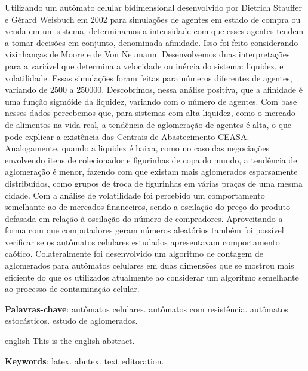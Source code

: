 \documentclass[
	12pt,				%
	openright,			%
	twoside,			%
	a4paper,			%
	english,			%
	french,				%
	spanish,			%
	brazil				%
	]{abntex2}
\begin{document}
\setlength{\absparsep}{18pt} %
\begin{resumo}
  Utilizando um autômato celular bidimensional desenvolvido por Dietrich Stauffer e Gérard Weisbuch em 2002 para simulações de agentes em estado de compra ou venda em um sistema, determinamos a intensidade com que esses agentes tendem a tomar decisões em conjunto, denominada afinidade. Isso foi feito considerando vizinhanças de Moore e de Von Neumann. Desenvolvemos duas interpretações para a variável que determina a velocidade ou inércia do sistema: liquidez, e volatilidade. Essas simulações foram feitas para números diferentes de agentes, variando de 2500 a 250000. Descobrimos, nessa análise positiva, que a afinidade é uma função sigmóide da liquidez, variando com o número de agentes. Com base nesses dados percebemos que, para sistemas com alta liquidez, como o mercado de alimentos na vida real, a tendência de aglomeração de agentes é alta, o que pode explicar a existência das Centrais de Abastecimento CEASA. Analogamente, quando a liquidez é baixa, como no caso das negociações envolvendo itens de colecionador e figurinhas de copa do mundo, a tendência de aglomeração é menor, fazendo com que existam mais aglomerados esparsamente distribuídos, como grupos de troca de figurinhas em várias praças de uma mesma cidade. Com a análise de volatilidade foi percebido um comportamento semelhante ao de mercados financeiros, sendo a oscilação do preço do produto defasada em relação à oscilação do número de compradores. Aproveitando a forma com que computadores geram números aleatórios também foi possível verificar se os autômatos celulares estudados apresentavam comportamento caótico. Colateralmente foi desenvolvido um algoritmo de contagem de aglomerados para autômatos celulares em duas dimensões que se mostrou mais eficiente do que os utilizados atualmente ao considerar um algoritmo semelhante ao processo de contaminação celular.

 \textbf{Palavras-chave}: autômatos celulares. autômatos com resistência. autômatos estocásticos. estudo de aglomerados.
\end{resumo}

\begin{resumo}[Abstract]
 \begin{otherlanguage*}{english}
   This is the english abstract.

   \vspace{\onelineskip}
 
   \noindent 
   \textbf{Keywords}: latex. abntex. text editoration.
 \end{otherlanguage*}
\end{resumo}
\end{document}
